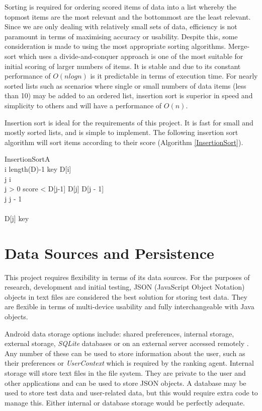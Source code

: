 Sorting is required for ordering scored items of data into a list whereby the topmost items are the most relevant and the bottommost are the least relevant. Since we are only dealing with relatively small sets of data, efficiency is not paramount in terms of maximising accuracy or usability. Despite this, some consideration is made to using the most appropriate sorting algorithms. 
Merge-sort which uses a divide-and-conquer approach is one of the most suitable for initial scoring of larger numbers of items. It is stable and due to its constant performance of $O(nlogn)$ is it predictable in terms of execution time. 
For nearly sorted lists such as scenarios where single or small numbers of data items (less than 10) may be added to an ordered list, insertion sort is superior in speed and simplicity to others and will have a performance of $O(n)$.

Insertion sort is ideal for the requirements of this project. It is fast for small and mostly sorted lists, and is simple to implement. The following insertion sort algorithm will sort items according to their score (Algorithm \ref{InsertionSort}).

\begin{pseudocode}{InsertionSort}{A}
	\label{InsertionSort}
	\\
	\FOR i \TO length(D)-1 \DO
	\BEGIN
		key \GETS D[i]\\
		j \GETS i\\
		\WHILE j > 0 \AND score < D[j-1] \DO
		\BEGIN
			D[j] \GETS D[j - 1]\\
			j \GETS j - 1\\
		\END \\
		D[j] \GETS key \\
	\END	
		
\end{pseudocode}

\section{Data Sources and Persistence}

This project requires flexibility in terms of its data sources. For the purposes of research, development and initial testing, JSON (JavaScript Object Notation) objects in text files are considered the best solution for storing test data. They are flexible in terms of multi-device usability and fully interchangeable with Java objects.

Android data storage options include: shared preferences, internal storage, external storage, \emph{SQLite} databases or on an external server accessed remotely \cite{BeginningAndroidDataPersistence}. Any number of these can be used to store information about the user, such as their preferences or \emph{UserContext} which is required by the ranking agent. Internal storage will store text files in the file system. They are private to the user and other applications and can be used to store JSON objects. A database may be used to store test data and user-related data, but this would require extra code to manage this. Either internal or database storage would be perfectly adequate.

